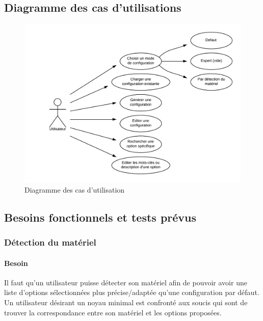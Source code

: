 \documentclass[16pts]{report}
\begin{document}
        \subsection{Diagramme des cas d'utilisations}
        \label{sub:Diagramme des cas d'utilisations}

\begin{figure}[H]
    \includegraphics[scale=0.25]{illustrations/diagramme_cas_utilisation.png}
    \centering
    \caption{Diagramme des cas d'utilisation}
    \label{fig:DCU}
\end{figure}

        \subsection{Besoins fonctionnels et tests prévus}
        \label{sub:Besoins fonctionnels et tests prévus}

\subsubsection{Détection du matériel}
\label{ssub:Détection du matériel}
\paragraph{Besoin}
\label{sssbus:Besoin}

Il faut qu’un utilisateur puisse détecter son matériel afin de pouvoir
avoir une liste d’options sélectionnées plus précise/adaptée qu’une
configuration par défaut. Un utilisateur désirant un noyau minimal est
confronté aux soucis qui sont de trouver la correspondance entre son matériel et
les options proposées.
\\
\end{document}
